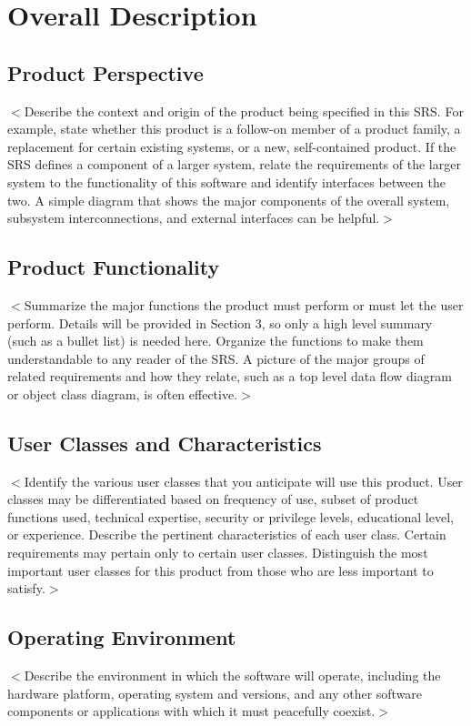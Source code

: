 \documentclass[a4paper, 11pt]{scrreprt}
\begin{document}
\chapter{Overall Description}

\section{Product Perspective}
$<$Describe the context and origin of the product being specified in this SRS.  
For example, state whether this product is a follow-on member of a product 
family, a replacement for certain existing systems, or a new, self-contained 
product. If the SRS defines a component of a larger system, relate the 
requirements of the larger system to the functionality of this software and 
identify interfaces between the two. A simple diagram that shows the major 
components of the overall system, subsystem interconnections, and external 
interfaces can be helpful.$>$

\section{Product Functionality}
$<$Summarize the major functions the product must perform or must let the user 
perform. Details will be provided in Section 3, so only a high level summary 
(such as a bullet list) is needed here. Organize the functions to make them 
understandable to any reader of the SRS. A picture of the major groups of 
related requirements and how they relate, such as a top level data flow diagram 
or object class diagram, is often effective.$>$

\section{User Classes and Characteristics}
$<$Identify the various user classes that you anticipate will use this product.  
User classes may be differentiated based on frequency of use, subset of product 
functions used, technical expertise, security or privilege levels, educational 
level, or experience. Describe the pertinent characteristics of each user class.  
Certain requirements may pertain only to certain user classes. Distinguish the 
most important user classes for this product from those who are less important 
to satisfy.$>$

\section{Operating Environment}
$<$Describe the environment in which the software will operate, including the 
hardware platform, operating system and versions, and any other software 
components or applications with which it must peacefully coexist.$>$
\end{document}

